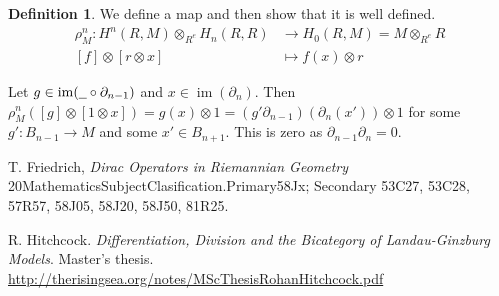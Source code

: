 \documentclass[12pt]{article}
\theoremstyle{plain}
\theoremstyle{definition}
\newtheorem{defn}[thm]{Definition} %
\newcommand{\und}[1]{\underline{\hspace{#1 cm}}}
\newcommand{\lto}{\longrightarrow}
\begin{document}
\begin{defn}
	We define a map and then show that it is well defined.
	\begin{align*}
		\rho_M^n: H^n(R,M) \otimes_{R^e} H_n(R, R) &\lto H_0(R,M) = M \otimes_{R^e} R\\
		[f] \otimes [r \otimes x] &\longmapsto f(x) \otimes r
		\end{align*}
	\end{defn}
Let $g \in \operatorname{im}(\und{0.2} \circ \partial_{n-1})$ and $x \in \operatorname{im}(\partial_{n})$. Then $\rho_M^n([g] \otimes [1 \otimes x]) = g(x) \otimes 1 = (g' \partial_{n-1})(\partial_n(x')) \otimes 1$ for some $g': B_{n-1} \lto M$ and some $x' \in B_{n+1}$. This is zero as $\partial_{n-1}\partial_n = 0$.









\begin{thebibliography}{99}
	 T. Friedrich, \emph{Dirac Operators in Riemannian Geometry} 20MathematicsSubjectClasification.Primary58Jx; Secondary 53C27, 53C28, 57R57, 58J05, 58J20, 58J50, 81R25.
	
	 R. Hitchcock. \emph{Differentiation, Division and the Bicategory of Landau-Ginzburg Models}. Master's thesis. \url{http://therisingsea.org/notes/MScThesisRohanHitchcock.pdf}
	\end{thebibliography}
\end{document}
